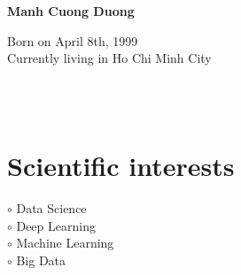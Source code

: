 \documentclass[a4paper,10pt]{article}
\begin{document}
\thispagestyle{empty}

\begin{adjustbox}{valign=t}
\begin{minipage}{0.3\textwidth} %
\begin{center}

\MySkip 	%

{\LARGE \bfseries Manh Cuong Duong}

\MySkip 	%

Born on April 8th, 1999\\
Currently living in Ho Chi Minh City\\

\MySkip 	%

\textcolor{ColorTwo}{\faEnvelopeO} 
 \\

\textcolor{ColorTwo}{\faGithub} 
\\

\textcolor{ColorTwo}{\faPhone} 
\end{center}

\vfill

\section*{Scientific interests}
\raggedright
\textcolor{ColorOne}{$\circ$} Data Science\\
\textcolor{ColorOne}{$\circ$} Deep Learning\\
\textcolor{ColorOne}{$\circ$} Machine Learning\\
\textcolor{ColorOne}{$\circ$} Big Data\\


\end{minipage}
\end{adjustbox}
\end{document}
